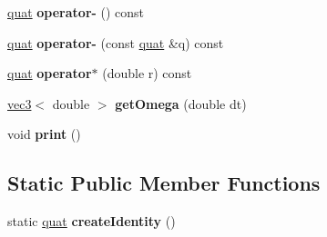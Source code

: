 \begin{DoxyCompactItemize}
\item 
\hypertarget{classmath_1_1quat_a180b5c18159637593b0d67d39bb2a0c8}{
\hyperlink{classmath_1_1quat}{quat} {\bfseries operator-\/} () const }
\label{classmath_1_1quat_a180b5c18159637593b0d67d39bb2a0c8}

\item 
\hypertarget{classmath_1_1quat_ab63582f1e6470c0e194d0e3a56e877a4}{
\hyperlink{classmath_1_1quat}{quat} {\bfseries operator-\/} (const \hyperlink{classmath_1_1quat}{quat} \&q) const }
\label{classmath_1_1quat_ab63582f1e6470c0e194d0e3a56e877a4}

\item 
\hypertarget{classmath_1_1quat_a3347486321da83dc25efc23bacc88978}{
\hyperlink{classmath_1_1quat}{quat} {\bfseries operator$\ast$} (double r) const }
\label{classmath_1_1quat_a3347486321da83dc25efc23bacc88978}

\item 
\hypertarget{classmath_1_1quat_a74566738661524ff50eccf6a5b8034f9}{
\hyperlink{classmath_1_1vec3}{vec3}$<$ double $>$ {\bfseries getOmega} (double dt)}
\label{classmath_1_1quat_a74566738661524ff50eccf6a5b8034f9}

\item 
\hypertarget{classmath_1_1quat_adf904d1bde884ccea84e06b4498d8d10}{
void {\bfseries print} ()}
\label{classmath_1_1quat_adf904d1bde884ccea84e06b4498d8d10}

\end{DoxyCompactItemize}
\subsection*{Static Public Member Functions}
\begin{DoxyCompactItemize}
\item 
\hypertarget{classmath_1_1quat_a8eda07c74adf541d6196b900aa36cb02}{
static \hyperlink{classmath_1_1quat}{quat} {\bfseries createIdentity} ()}
\label{classmath_1_1quat_a8eda07c74adf541d6196b900aa36cb02}

\end{DoxyCompactItemize}
